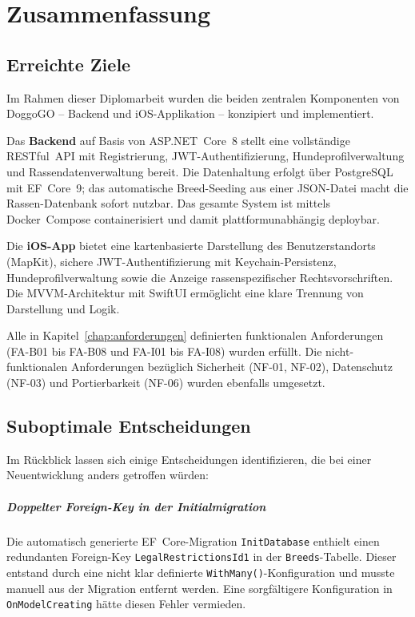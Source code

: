 \chapter{Zusammenfassung}
\label{chap:zusammenfassung}

\section{Erreichte Ziele}
\label{sec:erreichte-ziele}

Im Rahmen dieser Diplomarbeit wurden die beiden zentralen Komponenten von DoggoGO –
Backend und iOS-Applikation – konzipiert und implementiert.

Das \textbf{Backend} auf Basis von ASP.NET~Core~8 stellt eine vollständige RESTful~API
mit Registrierung, JWT-Authentifizierung, Hundeprofilverwaltung und Rassendatenverwaltung
bereit. Die Datenhaltung erfolgt über PostgreSQL mit EF~Core~9; das automatische
Breed-Seeding aus einer JSON-Datei macht die Rassen-Datenbank sofort nutzbar. Das
gesamte System ist mittels Docker~Compose containerisiert und damit plattformunabhängig
deploybar.

Die \textbf{iOS-App} bietet eine kartenbasierte Darstellung des Benutzerstandorts
(MapKit), sichere JWT-Authentifizierung mit Keychain-Persistenz, Hundeprofilverwaltung
sowie die Anzeige rassenspezifischer Rechtsvorschriften. Die MVVM-Architektur mit
SwiftUI ermöglicht eine klare Trennung von Darstellung und Logik.

Alle in Kapitel~\ref{chap:anforderungen} definierten funktionalen Anforderungen
(FA-B01 bis FA-B08 und FA-I01 bis FA-I08) wurden erfüllt. Die nicht-funktionalen
Anforderungen bezüglich Sicherheit (NF-01, NF-02), Datenschutz (NF-03) und
Portierbarkeit (NF-06) wurden ebenfalls umgesetzt.

\section{Suboptimale Entscheidungen}
\label{sec:suboptimal}

Im Rückblick lassen sich einige Entscheidungen identifizieren, die bei einer Neuentwicklung
anders getroffen würden:

\paragraph{Doppelter Foreign-Key in der Initialmigration}
Die automatisch generierte EF~Core-Migration \texttt{InitDatabase} enthielt einen
redundanten Foreign-Key \texttt{LegalRestrictionsId1} in der \texttt{Breeds}-Tabelle.
Dieser entstand durch eine nicht klar definierte \texttt{WithMany()}-Konfiguration und
musste manuell aus der Migration entfernt werden. Eine sorgfältigere Konfiguration in
\texttt{OnModelCreating} hätte diesen Fehler vermieden.

